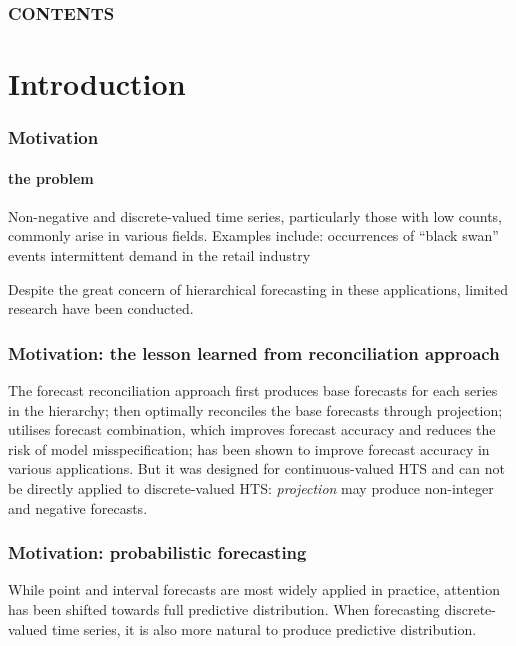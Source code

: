 \documentclass[12pt]{beamer}
\begin{document}
\begin{frame}
    \frametitle{CONTENTS}
    \tableofcontents
\end{frame}


\section{Introduction}
\begin{frame}
\frametitle{Motivation}
\framesubtitle{the problem}

\begin{outline}
\1 Non-negative and discrete-valued time series, particularly those with low counts, commonly arise in various fields. Examples include:
\2 occurrences of “black swan” events
\2 intermittent demand in the retail industry

\1 Despite the great concern of hierarchical forecasting in these applications, limited research have been conducted.


\end{outline}

\end{frame}

\begin{frame}
\frametitle{Motivation: the lesson learned from reconciliation approach}


\begin{outline}
    \0 The forecast reconciliation approach
    \1 first produces base forecasts for each series in the hierarchy; then optimally reconciles the base forecasts through projection;
    \1 utilises forecast combination, which improves forecast accuracy and reduces the risk of model misspecification;
    \1 has been shown to improve forecast accuracy in various applications.
    \0 But it was designed for continuous-valued HTS and can not be directly applied to discrete-valued HTS: \textit{projection} may produce non-integer and negative forecasts.
\end{outline}

\end{frame}


\begin{frame}
\frametitle{Motivation: probabilistic forecasting}
    \begin{outline}

        \1 While point and interval forecasts are most widely applied in practice, attention has been shifted towards full predictive distribution.
        \1 When forecasting discrete-valued time series, it is also more natural to produce predictive distribution.

    \end{outline}

\end{frame}
\end{document}
